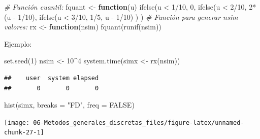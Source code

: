 \documentclass[
]{book}
\newenvironment{Shaded}{\begin{snugshade}}{\end{snugshade}}
\newcommand{\AttributeTok}[1]{\textcolor[rgb]{0.77,0.63,0.00}{#1}}
\newcommand{\CommentTok}[1]{\textcolor[rgb]{0.56,0.35,0.01}{\textit{#1}}}
\newcommand{\ConstantTok}[1]{\textcolor[rgb]{0.00,0.00,0.00}{#1}}
\newcommand{\ControlFlowTok}[1]{\textcolor[rgb]{0.13,0.29,0.53}{\textbf{#1}}}
\newcommand{\DecValTok}[1]{\textcolor[rgb]{0.00,0.00,0.81}{#1}}
\newcommand{\FunctionTok}[1]{\textcolor[rgb]{0.00,0.00,0.00}{#1}}
\newcommand{\NormalTok}[1]{#1}
\newcommand{\OtherTok}[1]{\textcolor[rgb]{0.56,0.35,0.01}{#1}}
\newcommand{\SpecialCharTok}[1]{\textcolor[rgb]{0.00,0.00,0.00}{#1}}
\newcommand{\StringTok}[1]{\textcolor[rgb]{0.31,0.60,0.02}{#1}}
\theoremstyle{break}
\theoremstyle{definition}
\theoremstyle{definition}
\theoremstyle{definition}
\theoremstyle{definition}
\theoremstyle{remark}
\begin{document}
\begin{enumerate}
\begin{Shaded}
\begin{Highlighting}[]
\CommentTok{\# Función cuantil:}
\NormalTok{fquant }\OtherTok{\textless{}{-}} \ControlFlowTok{function}\NormalTok{(u) }
  \FunctionTok{ifelse}\NormalTok{(u }\SpecialCharTok{\textless{}} \DecValTok{1}\SpecialCharTok{/}\DecValTok{10}\NormalTok{, }\DecValTok{0}\NormalTok{,}
         \FunctionTok{ifelse}\NormalTok{(u }\SpecialCharTok{\textless{}} \DecValTok{2}\SpecialCharTok{/}\DecValTok{10}\NormalTok{, }\DecValTok{2}\SpecialCharTok{*}\NormalTok{(u }\SpecialCharTok{{-}} \DecValTok{1}\SpecialCharTok{/}\DecValTok{10}\NormalTok{),}
                \FunctionTok{ifelse}\NormalTok{(u }\SpecialCharTok{\textless{}} \DecValTok{3}\SpecialCharTok{/}\DecValTok{10}\NormalTok{, }\DecValTok{1}\SpecialCharTok{/}\DecValTok{5}\NormalTok{, u }\SpecialCharTok{{-}} \DecValTok{1}\SpecialCharTok{/}\DecValTok{10}\NormalTok{) ) )}
\CommentTok{\# Función para generar nsim valores:}
\NormalTok{rx }\OtherTok{\textless{}{-}} \ControlFlowTok{function}\NormalTok{(nsim) }\FunctionTok{fquant}\NormalTok{(}\FunctionTok{runif}\NormalTok{(nsim))}
\end{Highlighting}
\end{Shaded}

  Ejemplo:

\begin{Shaded}
\begin{Highlighting}[]
\FunctionTok{set.seed}\NormalTok{(}\DecValTok{1}\NormalTok{)}
\NormalTok{nsim }\OtherTok{\textless{}{-}} \DecValTok{10}\SpecialCharTok{\^{}}\DecValTok{4}
\FunctionTok{system.time}\NormalTok{(simx }\OtherTok{\textless{}{-}} \FunctionTok{rx}\NormalTok{(nsim))}
\end{Highlighting}
\end{Shaded}

\begin{verbatim}
##    user  system elapsed 
##       0       0       0
\end{verbatim}

\begin{Shaded}
\begin{Highlighting}[]
\FunctionTok{hist}\NormalTok{(simx, }\AttributeTok{breaks =} \StringTok{"FD"}\NormalTok{, }\AttributeTok{freq =} \ConstantTok{FALSE}\NormalTok{)}
\end{Highlighting}
\end{Shaded}

  \begin{center}\texttt{[image: 06-Metodos\_generales\_discretas\_files/figure-latex/unnamed-chunk-27-1]} \end{center}


\end{enumerate}
\end{document}
